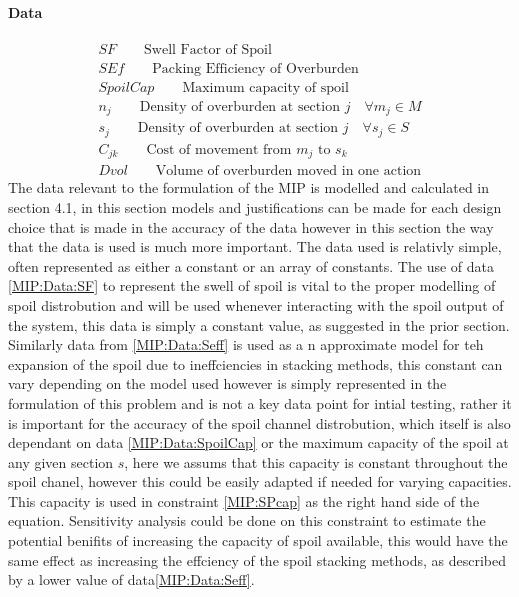 \paragraph*{Data}
\begin{align}
\label{MIP:Data:SF}
SF \qquad \text{Swell Factor of Spoil}\\
\label{MIP:Data:Seff}
SEf \qquad \text{Packing Efficiency of Overburden}\\
\label{MIP:Data:SpoilCap}
SpoilCap \qquad \text{Maximum capacity of spoil}\\
\label{MIP:Data:n}
n_{j} \qquad \text{Density of overburden at section $j$} \quad \forall m_{j}  \in M\\
\label{MIP:Data:s}
s_{j} \qquad \text{Density of overburden at section $j$} \quad \forall s_{j}  \in S\\
\label{MIP:Cost}
C_{jk} \qquad \text{Cost of movement from $m_{j}$ to $s_k$ }\\
\label{MIPDvol}
Dvol \qquad \text{Volume of overburden moved in one action}
\end{align}
The data relevant to the formulation of the MIP is modelled and calculated in section 4.1, in this section models and justifications can be made for each design choice that is made in the accuracy of the data however in this section the way that the data is used is much more important. The data used is relativly simple, often represented as either a constant or an array of constants. The use of data \ref{MIP:Data:SF} to represent the swell of spoil is vital to the proper modelling of spoil distrobution and will be used whenever interacting with the spoil output of the system, this data is simply a constant value, as suggested in the prior section. Similarly data from \ref{MIP:Data:Seff} is used as a n approximate model for teh expansion of the spoil due to ineffciencies in stacking methods, this constant can vary depending on the model used however is simply represented in the formulation of this problem and is not a key data point for intial testing, rather it is important for the accuracy of the spoil channel distrobution, which itself is also dependant on data \ref{MIP:Data:SpoilCap} or the maximum capacity of the spoil at any given section $s$, here we assums that this capacity is constant throughout the spoil chanel, however this could be easily adapted if needed for varying capacities. This capacity is used in constraint \ref{MIP:SPcap} as the right hand side of the equation. Sensitivity analysis could be done on this constraint to estimate the potential benifits of increasing the capacity of spoil available, this would have the same effect as increasing the effciency of the spoil stacking methods, as described by a lower value of data\ref{MIP:Data:Seff}.\\
